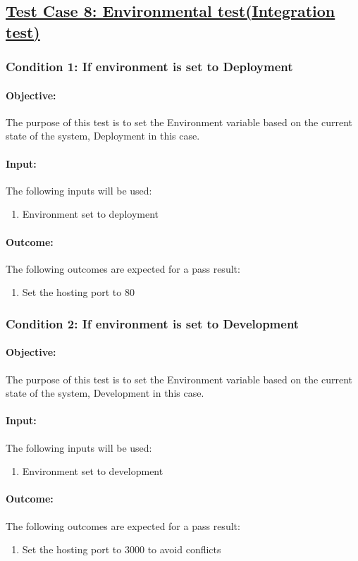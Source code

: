 \documentclass{article}
\begin{document}
\subsection{\underline{Test Case 8: Environmental test(Integration test)}}\label{test8}
\subsubsection{Condition 1: If environment is set to Deployment }
\paragraph{Objective:} The purpose of this test is to set the Environment variable based on the current state of the system, Deployment in this case.
\paragraph{Input:} The following inputs will be used:
\begin{enumerate}
	\item Environment set to deployment
\end{enumerate}
\paragraph{Outcome:} The following outcomes are expected for a pass result:
\begin{enumerate}
	\item Set the hosting port to 80
\end{enumerate}
\subsubsection{Condition 2: If environment is set to Development }
\paragraph{Objective:} The purpose of this test is to set the Environment variable based on the current state of the system, Development in this case.
\paragraph{Input:} The following inputs will be used:
\begin{enumerate}
	\item Environment set to development
\end{enumerate}
\paragraph{Outcome:} The following outcomes are expected for a pass result:
\begin{enumerate}
	\item Set the hosting port to 3000 to avoid conflicts
\end{enumerate}
\end{document}

